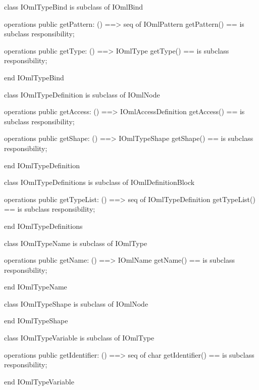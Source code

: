 \begin{vdm_al}
class IOmlTypeBind
 is subclass of IOmlBind

operations
  public getPattern: () ==> seq of IOmlPattern
  getPattern() == is subclass responsibility;

operations
  public getType: () ==> IOmlType
  getType() == is subclass responsibility;

end IOmlTypeBind
\end{vdm_al}

\begin{vdm_al}
class IOmlTypeDefinition
 is subclass of IOmlNode

operations
  public getAccess: () ==> IOmlAccessDefinition
  getAccess() == is subclass responsibility;

operations
  public getShape: () ==> IOmlTypeShape
  getShape() == is subclass responsibility;

end IOmlTypeDefinition
\end{vdm_al}

\begin{vdm_al}
class IOmlTypeDefinitions
 is subclass of IOmlDefinitionBlock

operations
  public getTypeList: () ==> seq of IOmlTypeDefinition
  getTypeList() == is subclass responsibility;

end IOmlTypeDefinitions
\end{vdm_al}

\begin{vdm_al}
class IOmlTypeName
 is subclass of IOmlType

operations
  public getName: () ==> IOmlName
  getName() == is subclass responsibility;

end IOmlTypeName
\end{vdm_al}

\begin{vdm_al}
class IOmlTypeShape
 is subclass of IOmlNode

end IOmlTypeShape
\end{vdm_al}

\begin{vdm_al}
class IOmlTypeVariable
 is subclass of IOmlType

operations
  public getIdentifier: () ==> seq of char
  getIdentifier() == is subclass responsibility;

end IOmlTypeVariable
\end{vdm_al}

